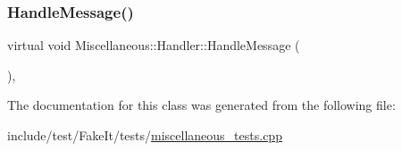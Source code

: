 \mbox{\label{classMiscellaneous_1_1Handler_a33c5675aa05ac3c973e9a4457e3fea71}} 
\subsubsection{\texorpdfstring{HandleMessage()}{HandleMessage()}}
{\footnotesize\ttfamily virtual void Miscellaneous\+::\+Handler\+::\+Handle\+Message (\begin{DoxyParamCaption}\item[{\mbox{\hyperlink{classMiscellaneous_1_1TMessage}{T\+Message}}}]{ }\end{DoxyParamCaption})\hspace{0.3cm}{\ttfamily [inline]}, {\ttfamily [virtual]}}



The documentation for this class was generated from the following file\+:\begin{DoxyCompactItemize}
\item 
include/test/\+Fake\+It/tests/\mbox{\hyperlink{miscellaneous__tests_8cpp}{miscellaneous\+\_\+tests.\+cpp}}\end{DoxyCompactItemize}
